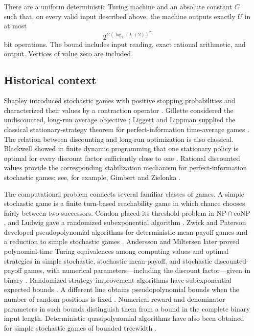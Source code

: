\begin{theorem}
\label{thm:main}
There are a uniform deterministic Turing machine and an absolute constant
$C$ such that, on every valid input described above, the machine outputs
exactly $U$ in at most
\[
                       2^{C(\log_2(L+2))^2}
\]
bit operations. The bound includes input reading, exact rational
arithmetic, and output. Vertices of value zero are included.
\end{theorem}

\subsection{Historical context}
\label{subsec:history}

Shapley introduced stochastic games with positive stopping probabilities
and characterized their values by a contraction operator
\cite{Shapley1953}. Gillette considered the undiscounted, long-run
average objective \cite{Gillette1957}; Liggett and Lippman supplied
the classical stationary-strategy theorem for perfect-information
time-average games \cite{LiggettLippman1969}. The relation between
discounting and long-run optimization is also classical. Blackwell
showed in finite dynamic programming that one stationary policy is
optimal for every discount factor sufficiently close to one
\cite{Blackwell1962}. Rational discounted values provide the
corresponding stabilization mechanism for perfect-information
stochastic games; see, for example, Gimbert and Zielonka
\cite[Theorem~3]{GimbertZielonka2010}.

The computational problem connects several familiar classes of games.
A simple stochastic game is a finite turn-based reachability game in
which chance chooses fairly between two successors. Condon placed its
threshold problem in $\mathrm{NP}\cap\mathrm{coNP}$
\cite{Condon1992}, and Ludwig gave a randomized subexponential
algorithm \cite{Ludwig1995}. Zwick and Paterson developed
pseudopolynomial algorithms for deterministic mean-payoff games and
a reduction to simple stochastic games \cite{ZwickPaterson1996}.
Andersson and Miltersen later proved polynomial-time Turing
equivalences among computing values and optimal strategies in
simple stochastic, stochastic mean-payoff, and stochastic
discounted-payoff games, with numerical parameters---including the
discount factor---given in binary
\cite[Theorem~1]{AnderssonMiltersen2009}.
Randomized strategy-improvement algorithms have
subexponential expected bounds \cite{Zwick2026}. A different line
obtains pseudopolynomial bounds when the number of random positions
is fixed \cite{BorosEtAl2019,AllamigeonEtAl2025}. Numerical reward
and denominator parameters in such bounds distinguish them from a
bound in the complete binary input length. Deterministic
quasipolynomial algorithms have also been obtained for simple
stochastic games of bounded treewidth \cite{ChatterjeeEtAl2023}.

